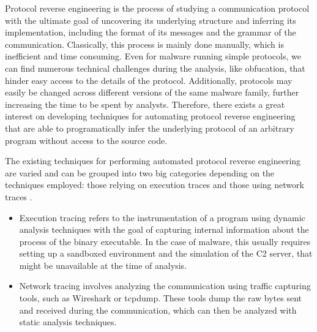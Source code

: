 \documentclass[conference]{IEEEtran}
\begin{document}
Protocol reverse engineering is the process of studying a communication
protocol with the ultimate goal of uncovering its underlying structure and
inferring its implementation, including the format of its messages and the
grammar of the communication. Classically, this process is mainly done
manually, which is inefficient and time consuming. Even for malware running
simple protocols, we can find numerous technical challenges during the
analysis, like obfucation, that hinder easy access to the details of the
protocol. Additionally, protocols may easily be changed across different
versions of the same malware family, further increasing the time to be spent by
analysts. Therefore, there exists a great interest on developing techniques for
automating protocol reverse engineering that are able to programatically infer
the underlying protocol of an arbitrary program without access to the source
code.

The existing techniques for performing automated protocol reverse engineering
are varied and can be grouped into two big categories depending on the
techniques employed: those relying on execution traces and those using network
traces \cite{sota_apre}\cite{sota_apre2}.

\begin{itemize}
    \item Execution tracing refers to the instrumentation of a program using dynamic
          analysis techniques with the goal of capturing internal information about the
          process of the binary executable. In the case of malware, this usually requires
          setting up a sandboxed environment and the simulation of the C2 server, that
          might be unavailable at the time of analysis.
    \item Network tracing involves analyzing the communication using traffic capturing
          tools, such as Wireshark or tcpdump. These tools dump the raw bytes sent and
          received during the communication, which can then be analyzed with static
          analysis techniques.
\end{itemize}
\end{document}
